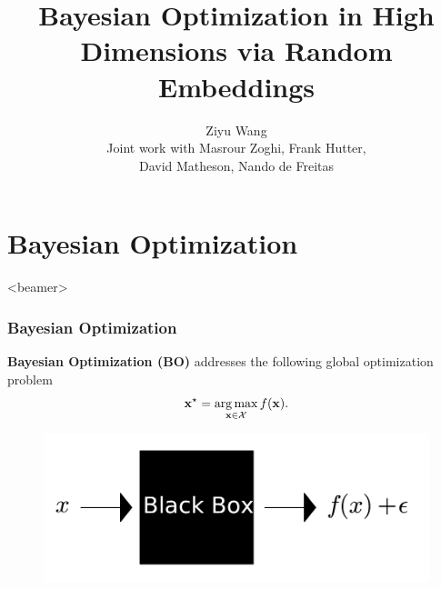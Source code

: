 \documentclass[grey]{beamer}
\title{Bayesian Optimization in High Dimensions via Random Embeddings}
\author[Ziyu Wang]{Ziyu Wang\\ [3mm]Joint work with Masrour Zoghi, Frank Hutter, \\
David Matheson, Nando de Freitas}
\date{}                    %
\DeclareMathOperator*{\argmax}{arg\,max}
\begin{document}
\begin{frame}
  \titlepage
\end{frame}

\section[Outline]{}

\begin{frame}
  \tableofcontents
\end{frame}


\section{Bayesian Optimization}
\label{sec:ahmc}
\begin{frame}<beamer>
 \tableofcontents[currentsection]
\end{frame}

\begin{frame}
 \frametitle{Bayesian Optimization}
 {\bf \textcolor{myColor}{Bayesian Optimization (BO)}}
 addresses the following global optimization problem
 \[ \vx^{\star} = \argmax_{\vx \in {\cal X}} f(\vx). \]
 
 \begin{figure}
   \centering
   \includegraphics[width=0.75\columnwidth]
   {./figs/blackbox}
   \label{fig:traj}
  \end{figure}
\end{frame}
\end{document}
